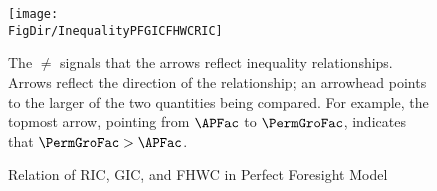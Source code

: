 \begin{figure}[ht]
  \label{fig:InequalityPFGICFHWCRIC}
  \centerline{
    \texttt{[image: \\FigDir/InequalityPFGICFHWCRIC]}
  }
  \caption{Relation of {RIC}, {GIC}, and {FHWC} in Perfect Foresight Model}
  \footnotesize{The $\neq$ signals that the arrows reflect inequality relationships.  Arrows reflect the direction of the relationship; an arrowhead points to the larger of the two quantities being compared.  For example, the topmost arrow, pointing from $\APFac$ to $\PermGroFac$, indicates that $\PermGroFac > \APFac$.}
\end{figure}
